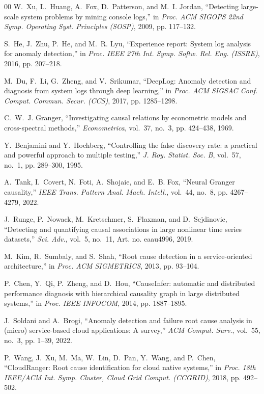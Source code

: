 \documentclass[conference]{IEEEtran}
\begin{document}
\begin{thebibliography}{00}
W.~Xu, L.~Huang, A.~Fox, D.~Patterson, and M.~I. Jordan, ``Detecting
large-scale system problems by mining console logs,'' in \emph{Proc. ACM
SIGOPS 22nd Symp. Operating Syst. Principles (SOSP)}, 2009, pp. 117--132.

S.~He, J.~Zhu, P.~He, and M.~R. Lyu, ``Experience report: System log analysis
for anomaly detection,'' in \emph{Proc. IEEE 27th Int. Symp. Softw. Rel. Eng.
(ISSRE)}, 2016, pp. 207--218.

M.~Du, F.~Li, G.~Zheng, and V.~Srikumar, ``DeepLog: Anomaly detection and
diagnosis from system logs through deep learning,'' in \emph{Proc. ACM SIGSAC
Conf. Comput. Commun. Secur. (CCS)}, 2017, pp. 1285--1298.

C.~W.~J. Granger, ``Investigating causal relations by econometric models and
cross-spectral methods,'' \emph{Econometrica}, vol.~37, no.~3, pp. 424--438,
1969.

Y.~Benjamini and Y.~Hochberg, ``Controlling the false discovery rate: a
practical and powerful approach to multiple testing,'' \emph{J. Roy. Statist.
Soc. B}, vol.~57, no.~1, pp. 289--300, 1995.

A.~Tank, I.~Covert, N.~Foti, A.~Shojaie, and E.~B. Fox, ``Neural Granger
causality,'' \emph{IEEE Trans. Pattern Anal. Mach. Intell.}, vol.~44,
no.~8, pp. 4267--4279, 2022.

J.~Runge, P.~Nowack, M.~Kretschmer, S.~Flaxman, and D.~Sejdinovic, ``Detecting
and quantifying causal associations in large nonlinear time series datasets,''
\emph{Sci. Adv.}, vol.~5, no.~11, Art. no. eaau4996, 2019.

M.~Kim, R.~Sumbaly, and S.~Shah, ``Root cause detection in a service-oriented
architecture,'' in \emph{Proc. ACM SIGMETRICS}, 2013, pp. 93--104.

P.~Chen, Y.~Qi, P.~Zheng, and D.~Hou, ``CauseInfer: automatic and distributed
performance diagnosis with hierarchical causality graph in large distributed
systems,'' in \emph{Proc. IEEE INFOCOM}, 2014, pp. 1887--1895.

J.~Soldani and A.~Brogi, ``Anomaly detection and failure root cause analysis
in (micro) service-based cloud applications: A survey,'' \emph{ACM Comput.
Surv.}, vol.~55, no.~3, pp. 1--39, 2022.

P.~Wang, J.~Xu, M.~Ma, W.~Lin, D.~Pan, Y.~Wang, and P.~Chen, ``CloudRanger:
Root cause identification for cloud native systems,'' in \emph{Proc. 18th
IEEE/ACM Int. Symp. Cluster, Cloud Grid Comput. (CCGRID)}, 2018,
pp. 492--502.


\end{thebibliography}
\end{document}
